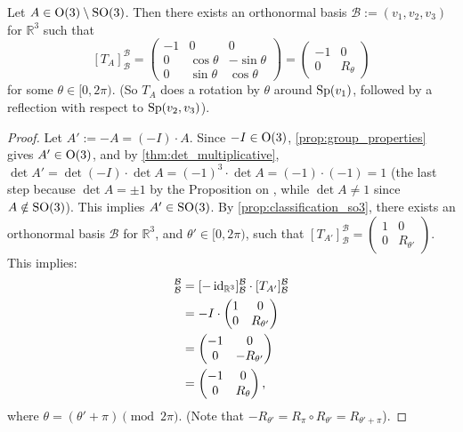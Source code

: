 \begin{proposition}
\label{prop:classification_o3_minus_so3}
Let $A \in \operatorname{O}(3) \setminus \operatorname{SO}(3)$. Then there exists an orthonormal basis $\mathcal{B} := (v_1, v_2, v_3)$ for $\mathbb{R}^3$ such that 
\[ [T_A]_{\mathcal{B}}^{\mathcal{B}} = \begin{pmatrix} -1 & 0 & 0 \\ 0 & \cos\theta & -\sin\theta \\ 0 & \sin\theta & \cos\theta \end{pmatrix} = \begin{pmatrix} -1 & 0 \\ 0 & R_\theta \end{pmatrix} \]
for some $\theta \in [0, 2\pi)$. (So $T_A$ does a rotation by $\theta$ around $\operatorname{Sp}(v_1)$, followed by a reflection with respect to $\operatorname{Sp}(v_2, v_3)$).
\end{proposition}

\begin{proof}
Let $A' := -A = (-I) \cdot A$. Since $-I \in \operatorname{O}(3)$, \cref{prop:group_properties} gives $A' \in \operatorname{O}(3)$, and by \cref{thm:det_multiplicative}, $\det A' = \det(-I) \cdot \det A = (-1)^3 \cdot \det A = (-1) \cdot (-1) = 1$ (the last step because $\det A = \pm 1$ by the Proposition on , while $\det A \neq 1$ since $A \notin \operatorname{SO}(3)$).
This implies $A' \in \operatorname{SO}(3)$. By \cref{prop:classification_so3}, there exists an orthonormal basis $\mathcal{B}$ for $\mathbb{R}^3$, and $\theta' \in [0, 2\pi)$, such that $[T_{A'}]_{\mathcal{B}}^{\mathcal{B}} = \left(\begin{smallmatrix} 1 & 0 \\ 0 & R_{\theta'} \end{smallmatrix}\right)$. 
This implies:
\begin{align*}
    [T_A]_{\mathcal{B}}^{\mathcal{B}} &= [-\id_{\mathbb{R}^3}]_{\mathcal{B}}^{\mathcal{B}} \cdot [T_{A'}]_{\mathcal{B}}^{\mathcal{B}} \\
    &= -I \cdot \begin{pmatrix} 1 & 0 \\ 0 & R_{\theta'} \end{pmatrix} \\
    &= \begin{pmatrix} -1 & 0 \\ 0 & -R_{\theta'} \end{pmatrix} \\
    &= \begin{pmatrix} -1 & 0 \\ 0 & R_\theta \end{pmatrix},
\end{align*}
where $\theta = (\theta' + \pi) \pmod{2\pi}$. 
(Note that $-R_{\theta'} = R_\pi \circ R_{\theta'} = R_{\theta' + \pi}$).
\end{proof}


